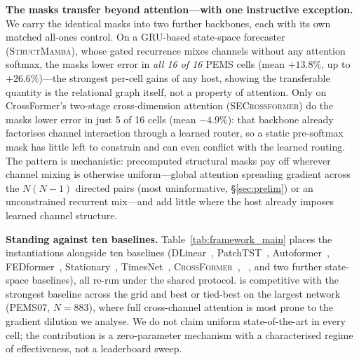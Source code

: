 \textbf{The masks transfer beyond attention---with one instructive exception.}
We carry the identical masks into two further backbones, each with its own
matched all-ones control. On a GRU-based state-space forecaster
(\textsc{StructMamba}), whose gated recurrence mixes channels without any
attention softmax, the masks lower error in \emph{all 16 of 16} PEMS cells
(mean $+13.8\%$, up to $+26.6\%$)---the strongest per-cell gains of any host,
showing the transferable quantity is the relational graph itself, not a property
of attention. Only on CrossFormer's two-stage cross-dimension attention
(\textsc{SECrossformer}) do the masks lower error in just 5 of 16 cells (mean
$-4.9\%$): that backbone already factorises channel interaction through a
learned router, so a static pre-softmax mask has little left to constrain and
can even conflict with the learned routing. The pattern is mechanistic:
precomputed structural masks pay off wherever channel mixing is otherwise
uniform---global attention spreading gradient across the $N(N{-}1)$ directed
pairs (most uninformative, §\ref{sec:prelim}) or an unconstrained recurrent
mix---and add little where the host already imposes learned channel structure.

\textbf{Standing against ten baselines.}
Table~\ref{tab:framework_main} places the instantiations alongside ten baselines
(DLinear~\cite{zeng2023transformers}, PatchTST~\cite{nie2022time},
Autoformer~\cite{wu2021autoformer}, FEDformer~\cite{zhou2022fedformer},
Stationary~\cite{liu2022non}, TimesNet~\cite{wu2023timesnet},
\textsc{CrossFormer}~\cite{zhang2023crossformer}, \itrans{}~\cite{liu2023itransformer},
and two further state-space baselines), all re-run under the shared protocol.
\mr{} is competitive with the strongest baseline across the grid and best or
tied-best on the largest network (PEMS07, $N{=}883$), where full cross-channel
attention is most prone to the gradient dilution we analyse. We do not claim
uniform state-of-the-art in every cell; the contribution is a zero-parameter
mechanism with a characterised regime of effectiveness, not a leaderboard sweep.
